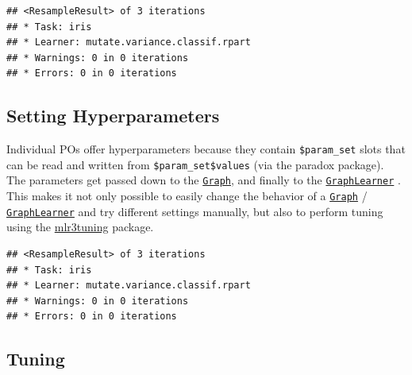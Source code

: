\documentclass[
]{scrbook}
\newenvironment{Shaded}{\begin{snugshade}}{\end{snugshade}}
\newcommand{\AttributeTok}[1]{\textcolor[rgb]{0.77,0.63,0.00}{#1}}
\newcommand{\DecValTok}[1]{\textcolor[rgb]{0.00,0.00,0.81}{#1}}
\newcommand{\FloatTok}[1]{\textcolor[rgb]{0.00,0.00,0.81}{#1}}
\newcommand{\FunctionTok}[1]{\textcolor[rgb]{0.00,0.00,0.00}{#1}}
\newcommand{\NormalTok}[1]{#1}
\newcommand{\OtherTok}[1]{\textcolor[rgb]{0.56,0.35,0.01}{#1}}
\newcommand{\SpecialCharTok}[1]{\textcolor[rgb]{0.00,0.00,0.00}{#1}}
\newcommand{\StringTok}[1]{\textcolor[rgb]{0.31,0.60,0.02}{#1}}
\renewenvironment{Shaded} {\begin{snugshade}\small} {\end{snugshade}}
\begin{document}
\begin{verbatim}
## <ResampleResult> of 3 iterations
## * Task: iris
## * Learner: mutate.variance.classif.rpart
## * Warnings: 0 in 0 iterations
## * Errors: 0 in 0 iterations
\end{verbatim}

\hypertarget{pipe-hyperpars}{%
\subsection{Setting Hyperparameters}\label{pipe-hyperpars}}

Individual POs offer hyperparameters because they contain \texttt{\$param\_set} slots that can be read and written from \texttt{\$param\_set\$values} (via the paradox package).
The parameters get passed down to the \href{https://mlr3pipelines.mlr-org.com/reference/Graph.html}{\texttt{Graph}}, and finally to the \href{https://mlr3pipelines.mlr-org.com/reference/mlr_learners_graph.html}{\texttt{GraphLearner}} .
This makes it not only possible to easily change the behavior of a \href{https://mlr3pipelines.mlr-org.com/reference/Graph.html}{\texttt{Graph}} / \href{https://mlr3pipelines.mlr-org.com/reference/mlr_learners_graph.html}{\texttt{GraphLearner}} and try different settings manually, but also to perform tuning using the \href{https://mlr3tuning.mlr-org.com}{mlr3tuning} package.

\begin{Shaded}
\end{Shaded}

\begin{verbatim}
## <ResampleResult> of 3 iterations
## * Task: iris
## * Learner: mutate.variance.classif.rpart
## * Warnings: 0 in 0 iterations
## * Errors: 0 in 0 iterations
\end{verbatim}

\hypertarget{pipe-tuning}{%
\subsection{Tuning}\label{pipe-tuning}}
\end{document}
